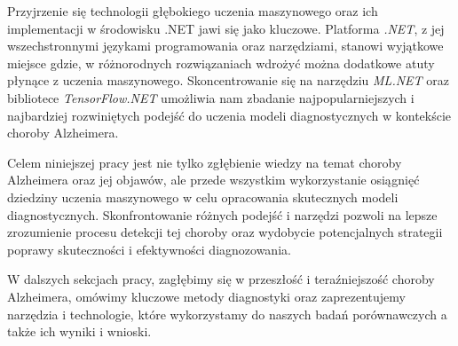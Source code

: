 Przyjrzenie się technologii głębokiego uczenia maszynowego oraz ich implementacji w środowisku .NET jawi się jako kluczowe.
Platforma \emph{.NET}, z jej wszechstronnymi językami programowania oraz narzędziami, stanowi wyjątkowe miejsce gdzie, w różnorodnych rozwiązaniach wdrożyć można dodatkowe atuty płynące z uczenia maszynowego.
Skoncentrowanie się na narzędziu \emph{ML.NET} oraz bibliotece \emph{TensorFlow.NET} umożliwia nam zbadanie najpopularniejszych i najbardziej rozwiniętych podejść do uczenia modeli diagnostycznych w kontekście choroby Alzheimera.

Celem niniejszej pracy jest nie tylko zgłębienie wiedzy na temat choroby Alzheimera oraz jej objawów, ale przede wszystkim wykorzystanie osiągnięć dziedziny uczenia maszynowego w celu opracowania skutecznych modeli diagnostycznych.
Skonfrontowanie różnych podejść i narzędzi pozwoli na lepsze zrozumienie procesu detekcji tej choroby oraz wydobycie potencjalnych strategii poprawy skuteczności i efektywności diagnozowania.

W dalszych sekcjach pracy, zagłębimy się w przeszłość i teraźniejszość choroby Alzheimera, omówimy kluczowe metody diagnostyki oraz zaprezentujemy narzędzia i technologie, które wykorzystamy do naszych badań porównawczych a także ich wyniki i wnioski.
